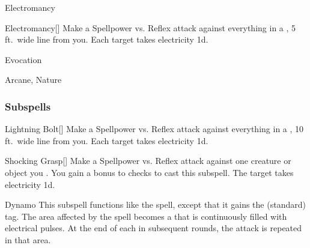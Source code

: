 \newpage
\begin{spellsection}{Electromancy}

\begin{spellheader}
\end{spellheader}


\begin{ability}{Electromancy}[]
Make a Spellpower vs. Reflex attack against everything in a \areamed, 5 ft.\ wide line from you.
\hit Each target takes electricity  \minus1d.
\end{ability}




 Evocation

 Arcane, Nature
\end{spellsection}


\subsubsection{Subspells}


\begin{ability}[\nth{1}]{Lightning Bolt}[]
Make a Spellpower vs. Reflex attack against everything in a \arealarge, 10 ft.\ wide line from you.
\hit Each target takes electricity  \minus1d.
\end{ability}
\vspace{0.25em}


\begin{ability}[\nth{1}]{Shocking Grasp}[]
Make a Spellpower vs. Reflex attack against one creature or object you .
You gain a  bonus to  checks to cast this subspell.
\hit The target takes electricity  \plus1d.
\end{ability}
\vspace{0.25em}


\begin{ability}[\nth{2}]{Dynamo}
This subspell functions like the  spell, except that it gains the  (standard) tag.
The area affected by the spell becomes a  that is continuously filled with electrical pulses.
At the end of each  in subsequent rounds, the attack is repeated in that area.
\end{ability}
\vspace{0.25em}


